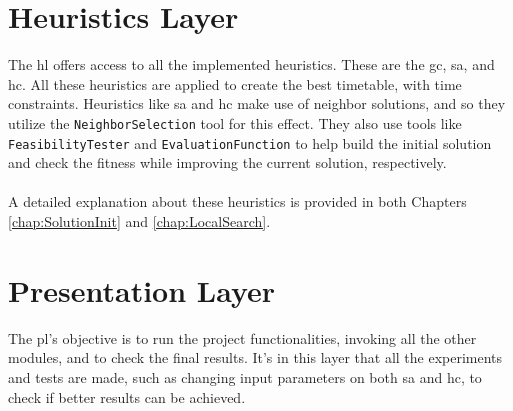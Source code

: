 \section{Heuristics Layer}

The \gls{hl} offers access to all the implemented heuristics. These are the \gls{gc}, \gls{sa}, and \gls{hc}. All these heuristics are applied to create the best timetable, with time constraints. Heuristics like \gls{sa} and \gls{hc} make use of neighbor solutions, and so they utilize the \verb+NeighborSelection+ tool for this effect. They also use tools like \verb+FeasibilityTester+ and \verb+EvaluationFunction+ to help build the initial solution and check the fitness while improving the current solution, respectively.\\
\\
A detailed explanation about these heuristics is provided in both Chapters \ref{chap:SolutionInit} and \ref{chap:LocalSearch}.

\section{Presentation Layer}

The \gls{pl}'s objective is to run the project functionalities, invoking all the other modules, and to check the final results. It's in this layer that all the experiments and tests are made, such as changing input parameters on both \gls{sa} and \gls{hc}, to check if better results can be achieved.










